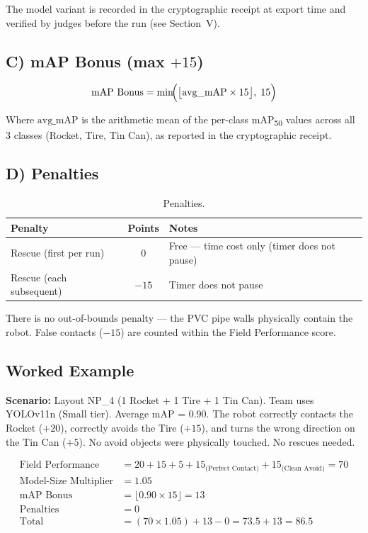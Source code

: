 \documentclass[a4]{article}
\begin{document}
The model variant is recorded in the cryptographic receipt at export time and verified by judges before the run (see Section~V).

\subsection*{C) mAP Bonus (max $+15$)}

\begin{equation*}
\text{mAP Bonus} = \min\!\Bigl(\bigl\lfloor \text{avg\_mAP} \times 15 \bigr\rfloor,\; 15\Bigr)
\end{equation*}

Where $\text{avg\_mAP}$ is the arithmetic mean of the per-class mAP\textsubscript{50} values across all 3 classes (Rocket, Tire, Tin Can), as reported in the cryptographic receipt.

\subsection*{D) Penalties}

\begin{table}[H]
\centering
\begin{tabular}{lcp{6.5cm}}
\toprule
\textbf{Penalty} & \textbf{Points} & \textbf{Notes} \\
\midrule
Rescue (first per run) & $0$ & Free --- time cost only (timer does not pause) \\
Rescue (each subsequent) & $-15$ & Timer does not pause \\
\bottomrule
\end{tabular}
\caption{Penalties.}
\end{table}

There is no out-of-bounds penalty --- the PVC pipe walls physically contain the robot. False contacts ($-15$) are counted within the Field Performance score.

\subsection*{Worked Example}

\textbf{Scenario:} Layout NP\_4 (1 Rocket + 1 Tire + 1 Tin Can). Team uses YOLOv11n (Small tier). Average mAP = 0.90. The robot correctly contacts the Rocket ($+20$), correctly avoids the Tire ($+15$), and turns the wrong direction on the Tin Can ($+5$). No avoid objects were physically touched. No rescues needed.

\begin{align*}
\text{Field Performance} &= 20 + 15 + 5 + 15_{\text{(Perfect Contact)}} + 15_{\text{(Clean Avoid)}} = 70 \\
\text{Model-Size Multiplier} &= 1.05 \\
\text{mAP Bonus} &= \lfloor 0.90 \times 15 \rfloor = 13 \\
\text{Penalties} &= 0 \\
\text{Total} &= (70 \times 1.05) + 13 - 0 = 73.5 + 13 = \mathbf{86.5}
\end{align*}
\end{document}
